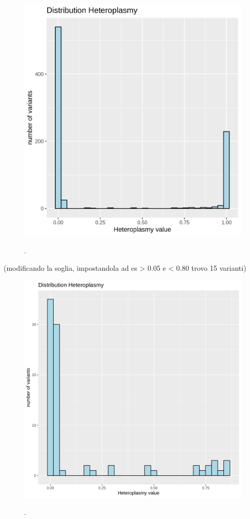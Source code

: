 \begin{figure}[H]
\centering
\includegraphics[width=\textwidth]{Fig/histogram.png}
\decoRule
\caption{\textbf{}} \textit{\cite{}}. 
\label{fig:distributionHet}
\end{figure} 

(modificando la soglia, impostandola ad es > 0.05 e < 0.80 trovo 15 varianti) \\ 


\begin{figure}[H]
\centering
\includegraphics[width=\textwidth]{Fig/dist_heteroplasmy_from-01-90.png}
\decoRule
\caption{\textbf{}} \textit{\cite{}}. 
\label{fig:distributionHet}
\end{figure} 


